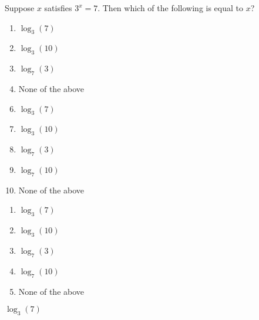 





 Suppose $x$ satisfies $3^{x}=7$.  Then which of the following is equal to $x$?


\ifsat
	\begin{enumerate}[label=\Alph*)]
		\item   $\log_{3}(7)$%
		\item  $\log_{3}(10)$
		\item  $\log_{7}(3)$
		\item  None of the above
	\end{enumerate}
\else
\fi

\ifacteven
	\begin{enumerate}[label=\textbf{\Alph*.},itemsep=\fill,align=left]
		\setcounter{enumii}{5}
		\item   $\log_{3}(7)$%
		\item  $\log_{3}(10)$
		\item  $\log_{7}(3)$
		\addtocounter{enumii}{1}
		\item  $\log_{7}(10)$
		\item  None of the above
	\end{enumerate}
\else
\fi

\ifactodd
	\begin{enumerate}[label=\textbf{\Alph*.},itemsep=\fill,align=left]
		\item   $\log_{3}(7)$%
		\item  $\log_{3}(10)$
		\item  $\log_{7}(3)$
		\item  $\log_{7}(10)$
		\item  None of the above
	\end{enumerate}
\else
\fi

\ifgridin
   $\log_{3}(7)$%
		
\else
\fi

